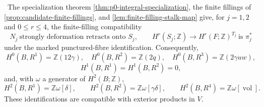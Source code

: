 \begin{proposition}
\label{prop:leray-e2}
\Verified\ The specialization theorem
\cref{thm:p0-integral-specialization}, the finite fillings of
\cref{prop:candidate-finite-fillings}, and
\cref{lem:finite-filling-stalk-map} give, for \(j=1,2\) and
\(0\le r\le4\), the finite-filling compatibility
\[
\tag{FF}
 N_j\ \text{strongly deformation retracts onto }S_j,\qquad
 H^r(S_j;\mathbb Z)\longrightarrow H^r(F;\mathbb Z)^{T_j}
 \ \text{is }\pi_j^*
\]
under the marked punctured-fibre identification.  Consequently,
\[
H^0(B,R^1)=\mathbb Z(12\gamma),\quad
H^0(B,R^2)=\mathbb Z(2q),\quad
H^0(B,R^3)=\mathbb Z(2\gamma uw),
\tag{5.10}
\]
\[
 H^1(B,R^1)=H^1(B,R^2)=0,
\tag{5.11}
\]
and, with \(\omega\) a generator of \(H^2(B;\mathbb Z)\),
\[
H^2(B,R^1)=\mathbb Z\omega[\delta],\qquad
H^2(B,R^2)=\mathbb Z\omega[\gamma\delta],\qquad
H^2(B,R^4)=\mathbb Z\omega[\operatorname{vol}].
\tag{5.12}
\]
These identifications are compatible with exterior products in \(V\).
\end{proposition}

